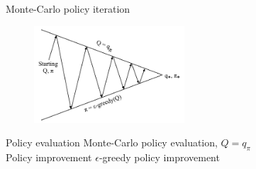 \bgroup
\begin{frame}{Monte-Carlo policy iteration}
\begin{figure}
\centering
\includegraphics[width=0.5\textwidth]{img/mc_policy_iteration.pdf}
\end{figure}
\textcolor{mImagelabRed}{Policy evaluation} Monte-Carlo policy evaluation, $Q=q_{\pi}$\\
\textcolor{mImagelabRed}{Policy improvement} \textcolor{mImagelabRed}{$\epsilon$}-greedy policy improvement
\end{frame}
\egroup